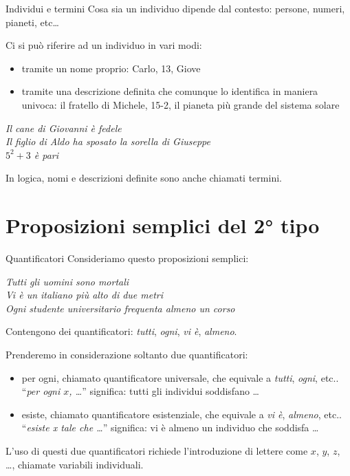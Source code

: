 \documentclass[10pt,dvipsnames]{beamer}
\begin{document}
\begin{frame}{Individui e termini}
	Cosa sia un individuo dipende dal contesto: persone, numeri, pianeti, etc\ldots

	\pause\medskip
	Ci si può riferire ad un individuo in vari modi:
	\begin{itemize}
		\item tramite un \alert{nome} proprio: Carlo, 13, Giove
		\item tramite una \alert{descrizione definita} che comunque lo identifica in maniera univoca: il fratello di Michele, 15-2, il pianeta più grande del sistema solare
	\end{itemize}
	\begin{example}
		\centering
		\itshape
		\alert{Il cane di Giovanni} è fedele\\
		\alert{Il figlio di Aldo} ha sposato \alert{la sorella di Giuseppe}\\
		\alert{$5^2+3$} è pari
	\end{example}
	\pause
	In logica, nomi e descrizioni definite sono anche chiamati \alert{termini}.
\end{frame}

\section{Proposizioni semplici del 2° tipo}

\begin{frame}{Quantificatori}
	Consideriamo questo proposizioni semplici:
	\begin{center}
		\itshape
		Tutti gli uomini sono mortali\\
		Vi è un italiano più alto di due metri\\
		Ogni studente universitario frequenta almeno un corso
	\end{center}
	Contengono dei \alert{quantificatori}: \emph{tutti}, \emph{ogni}, \emph{vi è}, \emph{almeno}.

	\pause
	\medskip
	Prenderemo in considerazione soltanto due quantificatori:
	\begin{itemize}
		\item \alert{per ogni}, chiamato \alert{quantificatore universale}, che equivale a \emph{tutti}, \emph{ogni}, etc..\\[0.1cm]
		``\emph{per ogni $x$, \ldots}'' significa: tutti gli individui soddisfano \ldots
		\item \alert{esiste}, chiamato \alert{quantificatore esistenziale}, che equivale a \emph{vi è}, \emph{almeno}, etc..\\[0.1cm]
		``\emph{esiste x tale che \ldots}'' significa: vi è almeno un individuo che soddisfa \ldots
	\end{itemize}

	\medskip
	L'uso di questi due quantificatori richiede l'introduzione di lettere come $x$, $y$, $z$, \ldots, chiamate \alert{variabili individuali}.
\end{frame}
\end{document}
